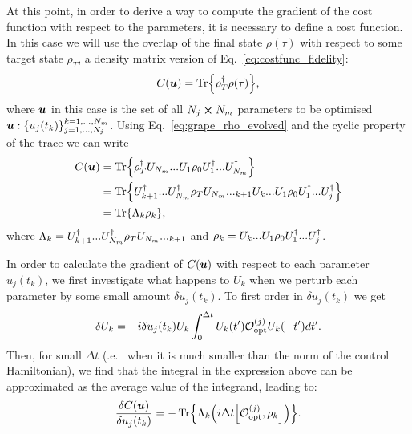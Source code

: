 At this point, in order to derive a way to compute the gradient of the cost function with respect to the parameters, it is necessary to define a cost function. In this case we will use the overlap of the final state $\rho(\tau)$ with respect to some target state $\rho_T$, a density matrix version of Eq.~\ref{eq:costfunc_fidelity}:
\begin{equation}
    C(\boldsymbol{u}) = \Tr{\rho_T^{\dagger}\rho(\tau)},
\end{equation}
where $\boldsymbol{u}$ in this case is the set of all $N_j \cross N_m$ parameters to be optimised $\boldsymbol{u}: \{ u_j(t_k)\}_{j = 1, ..., N_j}^{k = 1,...,N_m}$. Using Eq.~\ref{eq:grape_rho_evolved} and the cyclic property of the trace we can write
\begin{equation}\label{eq:grape_costfunc_rewrite}
    \begin{aligned}
        C(\boldsymbol{u} ) &= \Tr{\rho_T^{\dagger}U_{N_m} ... U_{1} \rho_0 U^{\dagger}_{1} ... U^{\dagger}_{N_m}} \\
        &=  \Tr{U^{\dagger}_{k+1} ... U^{\dagger}_{N_m} \rho_T U_{N_m} ... _{k+1} U_{k} ... U_{1} \rho_0 U^{\dagger}_{1} ... U^{\dagger}_{j}} \\
        &= \Tr{\Lambda_k \rho_k},
    \end{aligned}
\end{equation}
where $\Lambda_k = U^{\dagger}_{k+1} ... U^{\dagger}_{N_m} \rho_T U_{N_m} ... _{k+1}$ and $\rho_k = U_{k} ... U_{1} \rho_0 U^{\dagger}_{1} ... U^{\dagger}_{j}$. 

In order to calculate the gradient of $C(\boldsymbol{u})$ with respect to each parameter $u_j(t_k)$, we first investigate what happens to $U_k$ when we perturb each parameter by some small amount $\delta u_j(t_k)$. To first order in $\delta u_j(t_k)$ we get
\begin{equation}
    \delta U_k = -i \delta u_j(t_k) U_k \int_0^{\Delta t} U_k(t') \mathcal{O}_{\rm opt}^{(j)} U_k(-t') dt'.
\end{equation}
Then, for small $\Delta t$ (\@i.e.~ when it is much smaller than the norm of the control Hamiltonian), we find that the integral in the expression above can be approximated as the average value of the integrand, leading to:
\begin{equation}\label{eq:grape_costfunc_gradient}
    \frac{\delta C(\ubb)}{\delta u_j(t_k)} = - \Tr{\Lambda_k \Big(i\Delta t \comm{\mathcal{O}_{\rm opt}^{(j)}}{\rho_k}\Big)}.
\end{equation}

